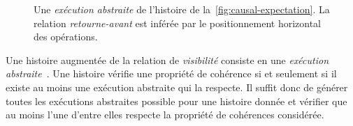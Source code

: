 \bigskip


\begin{figure}[htb]
\centering
{}
\caption[Exécution abstraite]{Une \emph{exécution abstraite} de l'histoire de la~\autoref{fig:causal-expectation}.
La relation \emph{retourne-avant} est inférée par le positionnement horizontal des opérations.
}\label{fig:vis-example}
\end{figure}

Une histoire augmentée de la relation de \emph{visibilité} consiste en une \emph{exécution abstraite}~\autocite{burckhardt_eventualconsistency_2014}.
Une histoire vérifie une propriété de cohérence si et seulement si il existe au moins une exécution abstraite qui la respecte.
Il suffit donc de générer toutes les exécutions abstraites possible pour une histoire donnée et vérifier que au moins l'une d'entre elles respecte la propriété de cohérences considérée.

